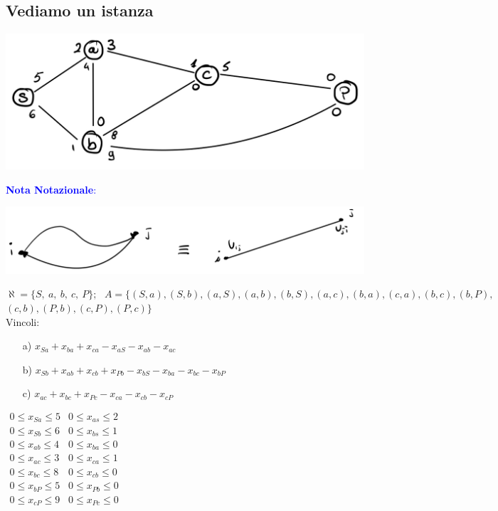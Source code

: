 \documentclass[12pt,a4paper]{article}
\begin{document}
\subsection{Vediamo un istanza}
\begin{center}
\includegraphics[width=0.6\columnwidth]{img/pb_maxflow_es.jpg}\\
\end{center}
{\scriptsize\textcolor{blue}{\textbf{Nota Notazionale}:} \begin{center}
\includegraphics[width=0.5\columnwidth]{img/pb_maxflow_nota.jpeg}\\
\end{center}}
$\aleph = \{S,\ a,\ b,\ c,\ P\}; \ \ \ A = \{(S,a), (S,b),(a,S),(a,b),(b,S),(a,c),(b,a), (c,a), (b,c),(b,P),$\\$(c,b),(P,b),(c,P), (P,c)\}$\\
Vincoli:
\begin{enumerate}
\item[a)] $x_{Sa} + x_{ba}+x_{ca}-x_{aS} - x_{ab}-x_{ac}$
\item[b)] $x_{Sb} + x_{ab}+x_{cb}+x_{Pb}-x_{bS} - x_{ba}-x_{bc}-x_{bP}$
\item[c)] $x_{ac} + x_{bc}+x_{Pc}-x_{ca} - x_{cb}-x_{cP}$
\end{enumerate}
$\begin{array}{cc}
0 \leq x_{Sa} \leq 5 & 0 \leq x_{as} \leq 2\\
0 \leq x_{Sb} \leq 6 & 0 \leq x_{bs} \leq 1\\
0 \leq x_{ab} \leq 4 & 0 \leq x_{ba} \leq 0\\
0 \leq x_{ac} \leq 3 & 0 \leq x_{ca} \leq 1\\
0 \leq x_{bc} \leq 8 & 0 \leq x_{cb} \leq 0\\
0 \leq x_{bP} \leq 5 & 0 \leq x_{Pb} \leq 0\\
0 \leq x_{cP} \leq 9 & 0 \leq x_{Pc} \leq 0\\
\end{array}$
\end{document}
